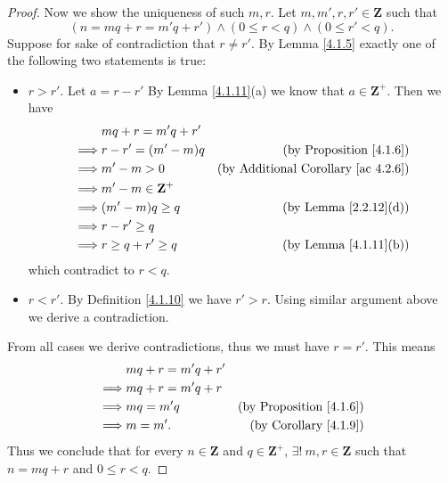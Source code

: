 \begin{proof}
    Now we show the uniqueness of such \(m, r\).
    Let \(m, m', r, r' \in \mathbf{Z}\) such that
    \[
        (n = mq + r = m'q + r') \land (0 \leq r < q) \land (0 \leq r' < q).
    \]
    Suppose for sake of contradiction that \(r \neq r'\).
    By Lemma \ref{4.1.5} exactly one of the following two statements is true:
    \begin{itemize}
        \item \(r > r'\).
              Let \(a = r - r'\)
              By Lemma \ref{4.1.11}(a) we know that \(a \in \mathbf{Z}^+\).
              Then we have
              \begin{align*}
                           & mq + r = m'q + r'                                                         \\
                  \implies & r - r' = (m' - m)q      & \text{(by Proposition \ref{4.1.6})}             \\
                  \implies & m' - m > 0              & \text{(by Additional Corollary \ref{ac 4.2.6})} \\
                  \implies & m' - m \in \mathbf{Z}^+                                                   \\
                  \implies & (m' - m)q \geq q        & \text{(by Lemma \ref{2.2.12}(d))}               \\
                  \implies & r - r' \geq q                                                             \\
                  \implies & r \geq q + r' \geq q    & \text{(by Lemma \ref{4.1.11}(b))}
              \end{align*}
              which contradict to \(r < q\).
        \item \(r < r'\).
              By Definition \ref{4.1.10} we have \(r' > r\).
              Using similar argument above we derive a contradiction.
    \end{itemize}
    From all cases we derive contradictions, thus we must have \(r = r'\).
    This means
    \begin{align*}
                 & mq + r = m'q + r'                                       \\
        \implies & mq + r = m'q + r                                        \\
        \implies & mq = m'q          & \text{(by Proposition \ref{4.1.6})} \\
        \implies & m = m'.           & \text{(by Corollary \ref{4.1.9})}
    \end{align*}
    Thus we conclude that for every \(n \in \mathbf{Z}\) and \(q \in \mathbf{Z}^+\), \(\exists!\ m, r \in \mathbf{Z}\) such that \(n = mq + r\) and \(0 \leq r < q\).
\end{proof}

